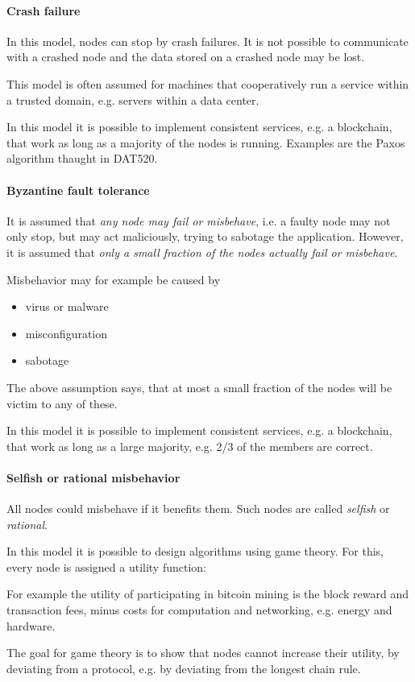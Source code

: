 \paragraph{Crash failure}
In this model, nodes can stop by crash failures. It is not possible to communicate with a crashed node and the data stored on a crashed node may be lost.

This model is often assumed for machines that cooperatively run a service within a trusted domain, e.g. servers within a data center. 

In this model it is possible to implement consistent services, e.g. a blockchain, that work as long as a majority of the nodes is running. Examples are the Paxos algorithm thaught in DAT520.

\paragraph{Byzantine fault tolerance}
It is assumed that \emph{any node may fail or misbehave}, i.e. a faulty node may not only stop, but may act maliciously, trying to sabotage the application. However, it is assumed that \emph{only a small fraction of the nodes actually fail or misbehave}.

Misbehavior may for example be caused by 
\begin{itemize}
	\item virus or malware
	\item misconfiguration
	\item sabotage
\end{itemize}
The above assumption says, that at most a small fraction of the nodes will be victim to any of these.

In this model it is possible to implement consistent services, e.g. a blockchain, that work as long as a large majority, e.g. 2/3 of the members are correct.

\paragraph{Selfish or rational misbehavior}
All nodes could misbehave if it benefits them. Such nodes are called \emph{selfish} or \emph{rational}. 

In this model it is possible to design algorithms using game theory. 
For this, every node is assigned a utility function:

For example the utility of participating in bitcoin mining is the block reward and transaction fees, minus costs for computation and networking, e.g. energy and hardware.

The goal for game theory is to show that nodes cannot increase their utility, by deviating from a protocol, e.g. by deviating from the longest chain rule.

